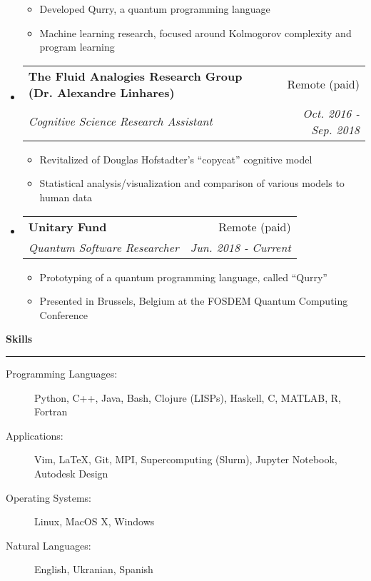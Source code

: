 \documentclass[letterpaper,11pt]{article}
\makeatletter
\newcommand{\sectionline}{
    \noindent\rule[0.5ex]{\linewidth}{0.5pt}
}
\newcommand{\resitem}[1]{\item #1 \vspace{-3pt}}
\newcommand{\resheading}[1]{
    {\large \textbf{#1}}
    \sectionline
}
\newcommand{\colfill}{@{\extracolsep{\fill}}}
\newcommand{\ressubheading}[4]{
\begin{tabular*}{6.5in}{l\colfill r}
		\textbf{#1} & #2 \\
		\textit{#3} & \textit{#4} \\
\end{tabular*}\vspace{-6pt}}
\makeatother
\begin{document}
\begin{itemize}
 	\begin{itemize}
        \resitem{Developed Qurry, a quantum programming language}
        \resitem{Machine learning research, focused around Kolmogorov complexity and program learning}
 	\end{itemize}
 \item
    \ressubheading{The Fluid Analogies Research Group (Dr. Alexandre Linhares)}{Remote (paid)}{Cognitive Science Research Assistant}{Oct. 2016 - Sep. 2018}
 	\begin{itemize}
 		\resitem{Revitalized of Douglas Hofstadter's ``copycat'' cognitive model}
 		\resitem{Statistical analysis/visualization and comparison of various models to human data}
 	\end{itemize}
 \item
     \ressubheading{Unitary Fund}{Remote (paid)}{Quantum Software Researcher}{Jun. 2018 - Current}
 	\begin{itemize}
            \resitem{Prototyping of a quantum programming language, called ``Qurry''}
            \resitem{Presented in Brussels, Belgium at the FOSDEM Quantum Computing Conference}
 	\end{itemize}
\end{itemize}

\resheading{Skills}
\begin{description}
    \item[Programming Languages:] 
        Python, C++, Java, Bash, Clojure (LISPs), Haskell, C, MATLAB, R, Fortran
    \item[Applications:]
        Vim, \LaTeX, Git, MPI, Supercomputing (Slurm), Jupyter Notebook, Autodesk Design 
    \item[Operating Systems:]
        Linux, MacOS X, Windows
    \item[Natural Languages:] 
        English, Ukranian, Spanish
\end{description}
\end{document}
